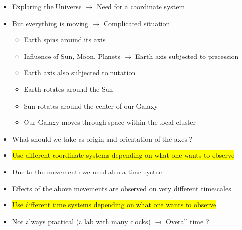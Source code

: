 \begin{itemize}
\item Exploring the Universe $\rightarrow$ {\blue Need for a coordinate system}
\item But {\blue everything is moving} $\rightarrow$ Complicated situation
\begin{itemize}
\item Earth spins around its axis
\item Influence of Sun, Moon, Planets $\rightarrow$ Earth axis subjected to precession
\item Earth axis also subjected to nutation
\item Earth rotates around the Sun
\item Sun rotates around the center of our Galaxy
\item Our Galaxy moves through space within the local cluster
\end{itemize}
\item What should we take as origin and orientation of the axes ?
\item[] \colorbox{yellow}{Use different coordinate systems depending on what one wants to observe}
\item Due to the movements we {\blue need also a time system}
\item[] Effects of the above movements are observed on very different timescales
\item[] \colorbox{yellow}{Use different time systems depending on what one wants to observe}
\item[] Not always practical (a lab with many clocks) $\rightarrow$ {\blue Overall time ?}
\end{itemize}
